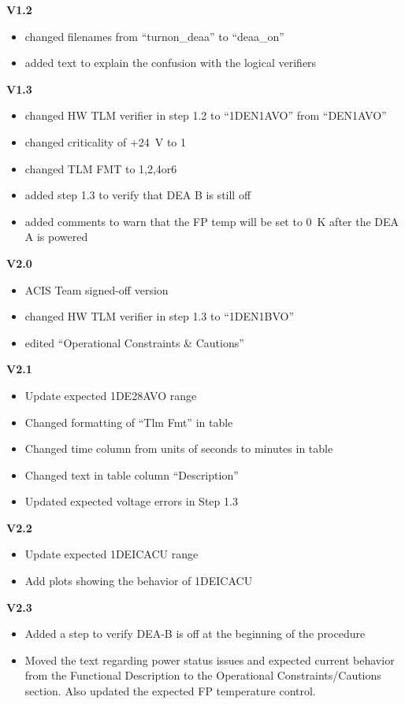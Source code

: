 \documentclass[11pt]{article}
\begin{document}
{\bf V1.2}
\begin{itemize}
\item changed filenames from ``turnon\_deaa'' to
``deaa\_on''
\item added text to explain the confusion with the logical verifiers
\end{itemize}

{\bf V1.3}
\begin{itemize}
\item changed HW TLM verifier in step 1.2 to ``1DEN1AVO'' from
``DEN1AVO''
\item changed criticality of +24~V to 1
\item changed TLM FMT to 1,2,4or6
\item added step 1.3 to verify that DEA B is still off
\item added comments to warn that the FP temp will be set to 0~K after the DEA A is powered
\end{itemize}

{\bf V2.0}
\begin{itemize}
\item ACIS Team signed-off version
\item changed HW TLM verifier in step 1.3 to ``1DEN1BVO''
\item edited ``Operational Constraints \& Cautions''
\end{itemize}

{\bf V2.1}
\begin{itemize}
\item Update expected 1DE28AVO range
\item Changed formatting of ``Tlm Fmt'' in table
\item Changed time column from units of seconds to minutes in table
\item Changed text in table column ``Description''
\item Updated expected voltage errors in Step 1.3
\end{itemize}

{\bf V2.2}
\begin{itemize}
\item Update expected 1DEICACU range
\item Add plots showing the behavior of 1DEICACU
\end{itemize}

{\bf V2.3}
\begin{itemize}
\item Added a step to verify DEA-B is off at the beginning of the procedure
\item Moved the text regarding power status issues and expected current behavior from the Functional Description to the Operational Constraints/Cautions section. Also updated the expected FP temperature control.
\end{itemize}
\end{document}
